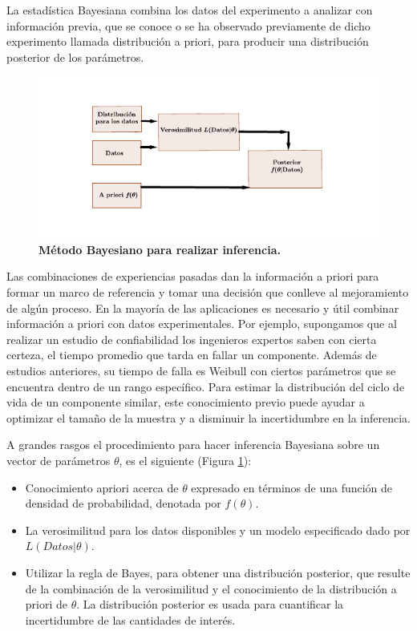 \noindent La estad\'istica Bayesiana  combina los datos del experimento a analizar con informaci\'on previa, que se conoce o se ha observado previamente de dicho experimento llamada distribuci\'on a priori, para producir una distribuci\'on posterior de los par\'ametros. \\[0.1cm]
\begin{figure}
\begin{center}
\includegraphics[scale=1.8]{bayes1.pdf}
\end{center}
\vspace{-2cm}\caption{\bf M\'etodo Bayesiano para realizar inferencia.}\label{eb}
\end{figure}
\noindent Las combinaciones de experiencias pasadas dan la informaci\'on a priori para formar un marco de referencia y tomar una decisi\'on que conlleve al mejoramiento de alg\'un proceso. En la mayor\'ia de las aplicaciones es necesario y \'util combinar informaci\'on a priori con datos experimentales. Por ejemplo,  supongamos que al realizar un estudio de confiabilidad los ingenieros expertos saben con cierta certeza, el tiempo promedio que tarda en fallar un componente.  
Adem\'as de  estudios anteriores, su tiempo de falla es Weibull con ciertos par\'ametros que se encuentra dentro de un rango espec\'ifico. Para estimar la distribuci\'on del ciclo de vida de un componente similar, este conocimiento previo puede ayudar a optimizar el  tama\~no de la muestra y a disminuir la incertidumbre  en la inferencia.


\noindent  A grandes rasgos el procedimiento para hacer inferencia Bayesiana sobre un vector de par\'ametros $\theta$, es el siguiente (Figura \ref{eb}):

\begin{itemize}
\item Conocimiento apriori acerca de $\theta$ expresado en t\'erminos de una funci\'on de densidad de probabilidad, denotada por $f(\theta)$.
\item La verosimilitud para los datos disponibles y un modelo especificado dado por $L(Datos|\theta)$.
\item Utilizar la regla de Bayes, para obtener una distribuci\'on posterior, que resulte de la combinaci\'on de la verosimilitud y el conocimiento de la distribuci\'on a priori de $\theta$. La distribuci\'on posterior es usada para cuantificar la incertidumbre de las cantidades de inter\'es.  
\end{itemize}
 

